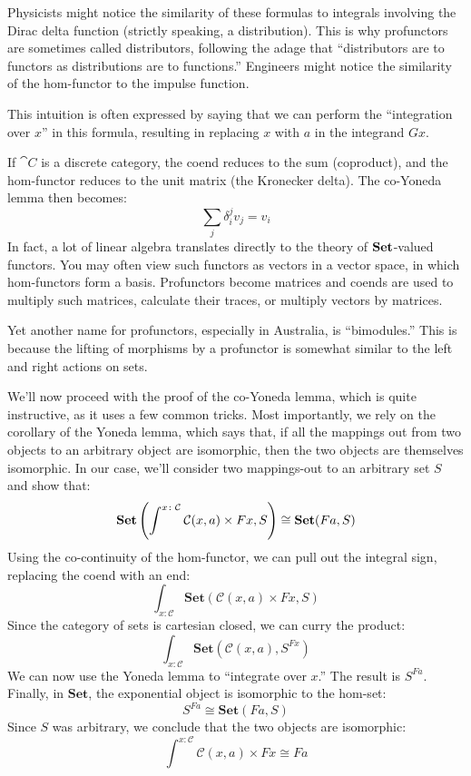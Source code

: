 \documentclass[DaoFP]{subfiles}
\begin{document}
Physicists might notice the similarity of these formulas to integrals involving the Dirac delta function (strictly speaking, a distribution). This is why profunctors are sometimes called distributors, following the adage that ``distributors are to functors as distributions are to functions.'' Engineers might notice the similarity of the hom-functor to the impulse function.

This intuition is often expressed by saying that we can perform the ``integration over $x$'' in this formula, resulting in replacing $x$ with $a$ in the integrand $G x$. 

If $\cat C$ is a discrete category, the coend reduces to the sum (coproduct), and the hom-functor reduces to the unit matrix (the Kronecker delta). The co-Yoneda lemma then becomes:
\[ \sum_j \delta_i^j v_j = v_i \]
In fact, a lot of linear algebra translates directly to the theory of $\mathbf{Set}$-valued functors. You may often view such functors as vectors in a vector space, in which hom-functors form a basis. Profunctors become matrices and coends are used to multiply such matrices, calculate their traces, or multiply vectors by matrices.

Yet another name for profunctors, especially in Australia, is ``bimodules.'' This is because the lifting of morphisms by a profunctor is somewhat similar to the left and right actions on sets. 

We'll now proceed with the proof of the co-Yoneda lemma, which is quite instructive, as it uses a few common tricks. Most importantly, we rely on the corollary of the Yoneda lemma, which says that, if all the mappings out from two objects to an arbitrary object are isomorphic, then the two objects are themselves isomorphic. In our case, we'll consider two mappings-out to an arbitrary set $S$ and show that:
\[ \mathbf{Set} \left(\int^{x \colon \mathcal{C}} \mathcal{C}(x, a) \times F x, S \right) \cong 
    \mathbf{Set} (F a, S)\]
Using the co-continuity of the hom-functor, we can pull out the integral sign, replacing the coend with an end:
\[ \int_{x \colon \mathcal{C}} \mathbf{Set} \left( \mathcal{C}(x, a) \times F x, S \right) \]
Since the category of sets is cartesian closed, we can curry the product:
\[ \int_{x \colon \mathcal{C}} \mathbf{Set} \left( \mathcal{C}(x, a) , S^{F x} \right) \]
We can now use the Yoneda lemma to ``integrate over $x$.'' The result is $S^{F a}$. Finally, in $\mathbf{Set}$, the exponential object is isomorphic to the hom-set:
\[S^{F a} \cong \mathbf{Set}(F a, S)\]
Since $S$ was arbitrary, we conclude that the two objects are isomorphic:
\[ \int^{x \colon \mathcal{C}} \mathcal{C}(x, a) \times F x \cong F a \]
\end{document}
